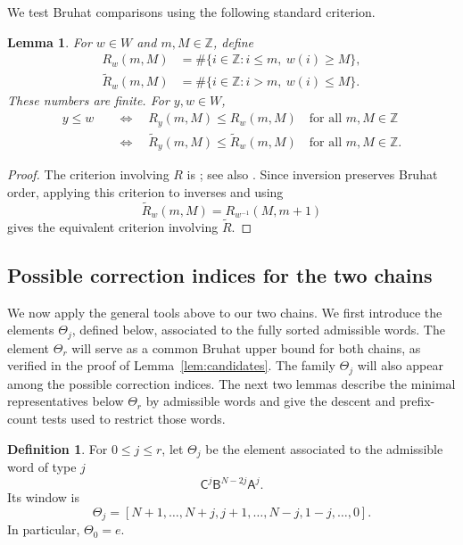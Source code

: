 \documentclass[11pt,a4paper,reqno]{amsart}
\numberwithin{equation}{section}
\newtheorem{lemma}[theorem]{Lemma}
\theoremstyle{definition}
\newtheorem{definition}[theorem]{Definition}
\theoremstyle{remark}
\theoremstyle{plain}
\newcommand{\A}{\mathsf A}
\newcommand{\B}{\mathsf B}
\newcommand{\CC}{\mathsf C}
\begin{document}
We test Bruhat comparisons using the following standard criterion.

\begin{lemma}\label{lem:affine-rank-criterion}
For $w\in W$ and $m,M\in\mathbb Z$, define
\begin{equation}\label{eq:affine-rank-functions}
\begin{aligned}
 R_w(m,M)&=\#\{i\in\mathbb Z:i\leq m,\ w(i)\geq M\},\\
 \widetilde R_w(m,M)&=\#\{i\in\mathbb Z:i>m,\ w(i)\leq M\}.
\end{aligned}
\end{equation}
These numbers are finite. For $y,w\in W$,
\begin{equation}\label{eq:affine-rank-criterion}
\begin{aligned}
 y\leq w
 &\quad\Longleftrightarrow\quad
 R_y(m,M)\leq R_w(m,M)
 \quad\text{for all }m,M\in\mathbb Z\\
 &\quad\Longleftrightarrow\quad
 \widetilde R_y(m,M)\leq\widetilde R_w(m,M)
 \quad\text{for all }m,M\in\mathbb Z.
\end{aligned}
\end{equation}
\end{lemma}
\begin{proof}
 The criterion involving
$R$ is \cite[Theorem~8.3.7]{BB}; see also
\cite[Proposition~4.1]{Henderson}. Since inversion preserves Bruhat
order, applying this criterion to inverses and using
\[
 \widetilde R_w(m,M)=R_{w^{-1}}(M,m+1)
\]
gives the equivalent criterion involving $\widetilde R$.
\end{proof}

\subsection{Possible correction indices for the two chains}
We now apply the general tools above to our two chains. We first
introduce the elements $\Theta_j$, defined below, associated to the
fully sorted admissible words. The element $\Theta_r$ will serve
as a common Bruhat upper bound for both chains, as verified in
the proof of Lemma~\ref{lem:candidates}. The family $\Theta_j$
will also appear among the possible correction indices. The next
two lemmas describe the minimal representatives below $\Theta_r$
by admissible words and give the descent and prefix-count tests
used to restrict those words.

\begin{definition}\label{def:theta}
For $0\leq j\leq r$, let $\Theta_j$ be the element associated to
the admissible word of type $j$
\[
 \CC^j\B^{N-2j}\A^j.
\]
Its window is
\[
 \Theta_j=[N+1,\ldots,N+j,j+1,\ldots,N-j,1-j,\ldots,0].
\]
In particular, $\Theta_0=e$.
\end{definition}
\end{document}
